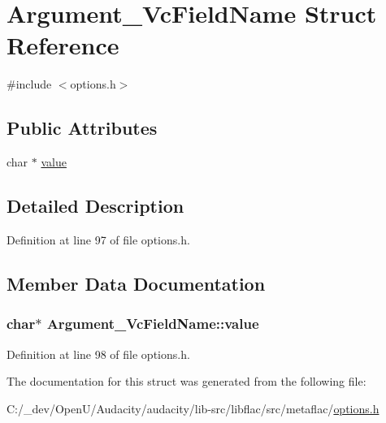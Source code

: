 \hypertarget{struct_argument___vc_field_name}{}\section{Argument\+\_\+\+Vc\+Field\+Name Struct Reference}
\label{struct_argument___vc_field_name}


{\ttfamily \#include $<$options.\+h$>$}

\subsection*{Public Attributes}
\begin{DoxyCompactItemize}
\item 
char $\ast$ \hyperlink{struct_argument___vc_field_name_a14908f3d09257968b8fda1bfc559061c}{value}
\end{DoxyCompactItemize}


\subsection{Detailed Description}


Definition at line 97 of file options.\+h.



\subsection{Member Data Documentation}
\subsubsection[{\texorpdfstring{value}{value}}]{\setlength{\rightskip}{0pt plus 5cm}char$\ast$ Argument\+\_\+\+Vc\+Field\+Name\+::value}\hypertarget{struct_argument___vc_field_name_a14908f3d09257968b8fda1bfc559061c}{}\label{struct_argument___vc_field_name_a14908f3d09257968b8fda1bfc559061c}


Definition at line 98 of file options.\+h.



The documentation for this struct was generated from the following file\+:\begin{DoxyCompactItemize}
\item 
C\+:/\+\_\+dev/\+Open\+U/\+Audacity/audacity/lib-\/src/libflac/src/metaflac/\hyperlink{libflac_2src_2metaflac_2options_8h}{options.\+h}\end{DoxyCompactItemize}
